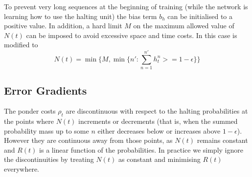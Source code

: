 \documentclass[10pt]{article}
\newcommand{\elabel}[1]{\label{eq:#1}}
\newcommand{\eref}[1]{\Cref{eq:#1}}
\begin{document}
To prevent very long sequences at the beginning of training (while the network is learning how to use the halting unit) the bias term $b_h$ can be initialised to a positive value.
In addition, a hard limit $M$ on the maximum allowed value of $N(t)$ can be imposed to avoid excessive space and time costs.
In this case \eref{epsilon} is modified to
\begin{equation}\elabel{max}
N(t) = \min\{M, \min\{n':\sum_{n=1}^{n'} h^n_t >= 1-\epsilon\}\}
\end{equation}
\subsection{Error Gradients}
The ponder costs $\rho_t$ are discontinuous with respect to the halting probabilities at the points where $N(t)$ increments or decrements (that is, when the summed probability mass up to some $n$ either decreases below or increases above $1-\epsilon$).
However they are continuous away from those points, as $N(t)$ remains constant and $R(t)$ is a linear function of the probabilities.
In practice we simply ignore the discontinuities by treating $N(t)$ as constant and minimising $R(t)$ everywhere.
\end{document}
